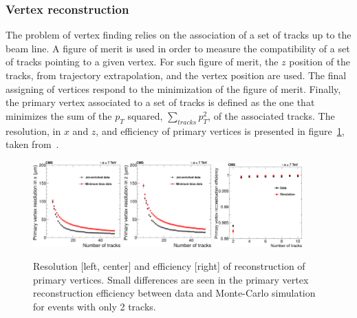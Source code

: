 \subsubsection{Vertex reconstruction}

The problem of vertex finding relies on the association of a set of tracks up to the beam line. A figure of merit is used in order to measure the compatibility of a set of tracks pointing to a given vertex. For such figure of merit, the $z$ position of the tracks, from trajectory extrapolation, and the vertex position are used. The final assigning of vertices respond to the minimization of the figure of merit. Finally, the primary vertex associated to a set of tracks is defined as the one that minimizes the sum of the $p_{T}$ squared, $\sum_{tracks}p_{T}^{2}$, of the associated tracks. The resolution, in $x$ and $z$, and efficiency of primary vertices is presented in figure~\ref{fig:VertexRec}, taken from~\cite{Chatrchyan:2014fea}.

\begin{figure}[!Hhtbp]
  \begin{center}
    \includegraphics[width=0.3\textwidth]{figs/PrimaryVertexResolutionX.png}
    \includegraphics[width=0.3\textwidth]{figs/PrimaryVertexResolutionZ.png}
    \includegraphics[width=0.3\textwidth]{figs/PrimaryVertexTagAndProbeEfficiency.png}
    \caption{Resolution [left, center] and efficiency [right] of reconstruction of primary vertices. Small differences are seen in the primary vertex reconstruction efficiency between data and Monte-Carlo simulation for events with only 2 tracks.}
    \label{fig:VertexRec}
  \end{center}
\end{figure}

